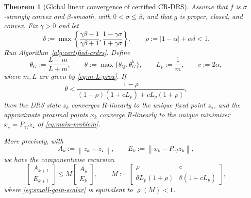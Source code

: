 \documentclass[10pt,leqno]{amsart}
\numberwithin{equation}{section}
\numberwithin{algorithm}{section}
\newtheorem{theorem}{Theorem}[section]
\theoremstyle{remark}
\newcommand{\norm}[1]{\left\lVert #1 \right\rVert}
\begin{document}
\begin{theorem}[Global linear convergence of certified CR-DRS]
\label{thm:global-certified-crdrs}
Assume that $f$ is $\sigma$-strongly convex and $\beta$-smooth, with $0<\sigma\le\beta$, and that $g$ is proper, closed, and convex.  Fix $\gamma>0$ and let
\begin{equation}
\label{eq:global-delta-rho}
    \delta:=\max\left\{
      \frac{\gamma\beta-1}{\gamma\beta+1},
      \frac{1-\gamma\sigma}{1+\gamma\sigma}
    \right\},
    \qquad
    \rho:=|1-\alpha|+\alpha\delta<1.
\end{equation}
Run Algorithm~\ref{alg:certified-crdrs}.  Define
\begin{equation}
\label{eq:inner-theta}
    \theta_G:=\frac{L-m}{L+m},
    \qquad
    \theta:=\max\{\theta_Q,\theta_G^b\},
    \qquad
    L_p:=\frac1m,
    \qquad
    c:=2\alpha,
\end{equation}
where $m,L$ are given by \eqref{eq:m-L-prox}.  If
\begin{equation}
\label{eq:small-gain-scalar}
    \theta
    <\frac{1-\rho}
    {(1-\rho)(1+cL_p)+cL_p(1+\rho)},
\end{equation}
then the DRS state $z_k$ converges $R$-linearly to the unique fixed point $z_\star$, and the approximate proximal points $x_k$ converge $R$-linearly to the unique minimizer
$x_\star=P_{\gamma f}z_\star$ of \eqref{eq:main-problem}.

More precisely, with
\begin{equation}
\label{eq:global-errors}
    A_k:=\norm{z_k-z_\star},
    \qquad
    E_k:=\norm{x_k-P_{\gamma f}z_k},
\end{equation}
we have the componentwise recursion
\begin{equation}
\label{eq:global-matrix-recursion}
    \begin{bmatrix}A_{k+1}\\E_{k+1}\end{bmatrix}
    \le
    M
    \begin{bmatrix}A_k\\E_k\end{bmatrix},
    \qquad
    M:=
    \begin{bmatrix}
       \rho & c\\
       \theta L_p(1+\rho) & \theta(1+cL_p)
    \end{bmatrix},
\end{equation}
where \eqref{eq:small-gain-scalar} is equivalent to $\varrho(M)<1$.
\end{theorem}
\end{document}
